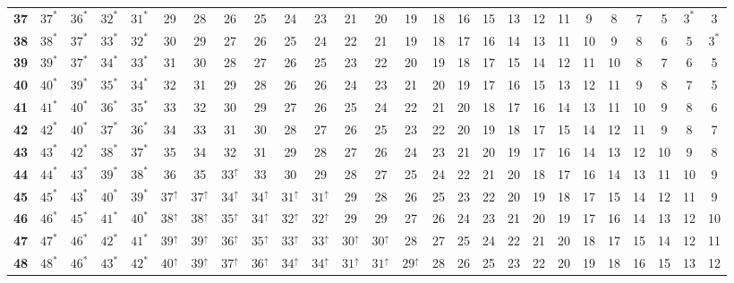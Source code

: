 \begin{table}
\begin{tabular}{|c| c c c c c c c c c c c c c c c c c c c c c c c c c |}
\textbf{37} & $37^*$ & $36^*$ & $32^*$ & $31^*$ & 29 & 28 & 26 & 25 & 24 & 23 & 21 & 20 & 19 & 18 & 16 & 15 & 13 & 12 & 11 & 9 & 8 & 7 & 5 & $3^*$ & 3 \\
\textbf{38} & $38^*$ & $37^*$ & $33^*$ & $32^*$ & 30 & 29 & 27 & 26 & 25 & 24 & 22 & 21 & 19 & 18 & 17 & 16 & 14 & 13 & 11 & 10 & 9 & 8 & 6 & 5 & $3^*$ \\
\textbf{39} & $39^*$ & $37^*$ & $34^*$ & $33^*$ & 31 & 30 & 28 & 27 & 26 & 25 & 23 & 22 & 20 & 19 & 18 & 17 & 15 & 14 & 12 & 11 & 10 & 8 & 7 & 6 & 5 \\
\textbf{40} & $40^*$ & $39^*$ & $35^*$ & $34^*$ & 32 & 31 & 29 & 28 & 26 & 26 & 24 & 23 & 21 & 20 & 19 & 17 & 16 & 15 & 13 & 12 & 11 & 9 & 8 & 7 & 5 \\
\textbf{41} & $41^*$ & $40^*$ & $36^*$ & $35^*$ & 33 & 32 & 30 & 29 & 27 & 26 & 25 & 24 & 22 & 21 & 20 & 18 & 17 & 16 & 14 & 13 & 11 & 10 & 9 & 8 & 6 \\
\textbf{42} & $42^*$ & $40^*$ & $37^*$ & $36^*$ & 34 & 33 & 31 & 30 & 28 & 27 & 26 & 25 & 23 & 22 & 20 & 19 & 18 & 17 & 15 & 14 & 12 & 11 & 9 & 8 & 7 \\
\textbf{43} & $43^*$ & $42^*$ & $38^*$ & $37^*$ & 35 & 34 & 32 & 31 & 29 & 28 & 27 & 26 & 24 & 23 & 21 & 20 & 19 & 17 & 16 & 14 & 13 & 12 & 10 & 9 & 8 \\
\textbf{44} & $44^*$ & $43^*$ & $39^*$ & $38^*$ & 36 & 35 & $33^\uparrow$ & 33 & 30 & 29 & 28 & 27 & 25 & 24 & 22 & 21 & 20 & 18 & 17 & 16 & 14 & 13 & 11 & 10 & 9 \\
\textbf{45} & $45^*$ & $43^*$ & $40^*$ & $39^*$ & $37^\uparrow$ & $37^\uparrow$ & $34^\uparrow$ & $34^\uparrow$ & $31^\uparrow$ & $31^\uparrow$ & 29 & 28 & 26 & 25 & 23 & 22 & 20 & 19 & 18 & 17 & 15 & 14 & 12 & 11 & 9 \\
\textbf{46} & $46^*$ & $45^*$ & $41^*$ & $40^*$ & $38^\uparrow$ & $38^\uparrow$ & $35^\uparrow$ & $34^\uparrow$ & $32^\uparrow$ & $32^\uparrow$ & 29 & 29 & 27 & 26 & 24 & 23 & 21 & 20 & 19 & 17 & 16 & 14 & 13 & 12 & 10 \\
\textbf{47} & $47^*$ & $46^*$ & $42^*$ & $41^*$ & $39^\uparrow$ & $39^\uparrow$ & $36^\uparrow$ & $35^\uparrow$ & $33^\uparrow$ & $33^\uparrow$ & $30^\uparrow$ & $30^\uparrow$ & 28 & 27 & 25 & 24 & 22 & 21 & 20 & 18 & 17 & 15 & 14 & 12 & 11 \\
\textbf{48} & $48^*$ & $46^*$ & $43^*$ & $42^*$ & $40^\uparrow$ & $39^\uparrow$ & $37^\uparrow$ & $36^\uparrow$ & $34^\uparrow$ & $34^\uparrow$ & $31^\uparrow$ & $31^\uparrow$ & $29^\uparrow$ & 28 & 26 & 25 & 23 & 22 & 20 & 19 & 18 & 16 & 15 & 13 & 12 \\

\end{tabular}
\end{table}
